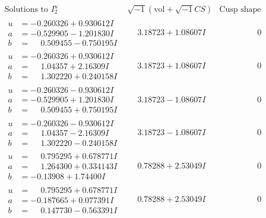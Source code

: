 \documentclass[1p]{elsarticle_modified}
\theoremstyle{definition}
\newcommand{\I}{\sqrt{-1}}
\begin{document}
$$\begin{array}{c|c|c}  
\text{Solutions to }I^u_{2}& \I (\text{vol} + \sqrt{-1}CS) & \text{Cusp shape}\\
 \hline 
\begin{aligned}
u &= -0.260326 + 0.930612 I \\
a &= -0.529905 - 1.201830 I \\
b &= \phantom{-}0.509455 - 0.750195 I\end{aligned}
 & \phantom{-}3.18723 + 1.08607 I & \phantom{-0.000000 } 0 \\ \hline\begin{aligned}
u &= -0.260326 + 0.930612 I \\
a &= \phantom{-}1.04357 + 2.16309 I \\
b &= \phantom{-}1.302220 + 0.240158 I\end{aligned}
 & \phantom{-}3.18723 + 1.08607 I & \phantom{-0.000000 } 0 \\ \hline\begin{aligned}
u &= -0.260326 - 0.930612 I \\
a &= -0.529905 + 1.201830 I \\
b &= \phantom{-}0.509455 + 0.750195 I\end{aligned}
 & \phantom{-}3.18723 - 1.08607 I & \phantom{-0.000000 } 0 \\ \hline\begin{aligned}
u &= -0.260326 - 0.930612 I \\
a &= \phantom{-}1.04357 - 2.16309 I \\
b &= \phantom{-}1.302220 - 0.240158 I\end{aligned}
 & \phantom{-}3.18723 - 1.08607 I & \phantom{-0.000000 } 0 \\ \hline\begin{aligned}
u &= \phantom{-}0.795295 + 0.678771 I \\
a &= \phantom{-}1.264300 + 0.334143 I \\
b &= -0.13908 + 1.74400 I\end{aligned}
 & \phantom{-}0.78288 + 2.53049 I & \phantom{-0.000000 } 0 \\ \hline\begin{aligned}
u &= \phantom{-}0.795295 + 0.678771 I \\
a &= -0.187665 + 0.077391 I \\
b &= \phantom{-}0.147730 - 0.563391 I\end{aligned}
 & \phantom{-}0.78288 + 2.53049 I & \phantom{-0.000000 } 0 \\ \hline\begin{aligned}

\end{aligned}
\end{array}$$
\end{document}
